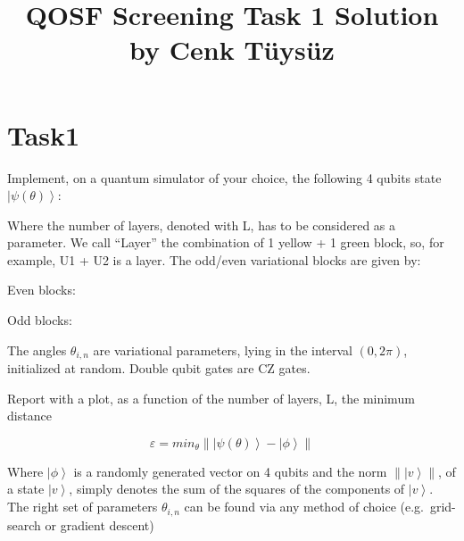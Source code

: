 \documentclass[11pt]{article}
\title{QOSF Screening Task 1 Solution\\
    \vspace{1ex}
    \small{by Cenk T\"uys\"uz}
    }
\begin{document}
    
    \maketitle
    
    

    
    \hypertarget{task1}{%
\section{Task1}\label{task1}}

\[\newcommand{\ket}[1]{\left|{#1}\right\rangle}\] Implement, on a
quantum simulator of your choice, the following 4 qubits state
\(\newcommand{\ket}[1]{\left|{#1}\right\rangle} \ket{\psi(\theta)}\):

    \begin{center}

    \end{center}

Where the number of layers, denoted with L, has to be considered as a
parameter. We call ``Layer'' the combination of 1 yellow + 1 green
block, so, for example, U1 + U2 is a layer. The odd/even variational
blocks are given by:

Even blocks:

    \begin{center}

    \end{center}

Odd blocks:

    \begin{center}

    \end{center}

The angles \(\theta_{i,n}\) are variational parameters, lying in the
interval \((0, 2\pi)\), initialized at random. Double qubit gates are CZ
gates.

Report with a plot, as a function of the number of layers, L, the
minimum distance

\[\newcommand{\ket}[1]{\left|{#1}\right\rangle} \varepsilon = min_\theta \parallel \ket{\psi(\theta)} - \ket{\phi} \parallel  \]

Where \(\newcommand{\ket}[1]{\left|{#1}\right\rangle} \ket{\phi}\) is a
randomly generated vector on 4 qubits and the norm
\(\newcommand{\ket}[1]{\left|{#1}\right\rangle} \parallel \ket{v} \parallel\),
of a state \(\newcommand{\ket}[1]{\left|{#1}\right\rangle} \ket{v}\),
simply denotes the sum of the squares of the components of
\(\newcommand{\ket}[1]{\left|{#1}\right\rangle} \ket{v}\). The right set
of parameters \(\theta_{i,n}\) can be found via any method of choice
(e.g.~grid-search or gradient descent)
\end{document}
